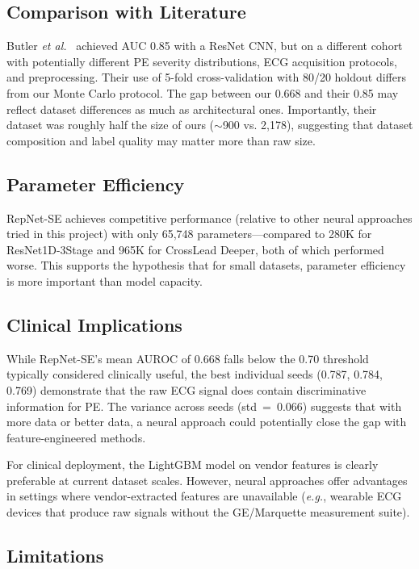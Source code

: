\documentclass[11pt,a4paper]{article}
\newcommand{\eg}{\textit{e.g.}}
\newcommand{\etal}{\textit{et al.}}
\begin{document}
\subsection{Comparison with Literature}

Butler \etal~\cite{butler2024} achieved AUC 0.85 with a ResNet CNN, but on a different cohort with potentially different PE severity distributions, ECG acquisition protocols, and preprocessing. Their use of 5-fold cross-validation with 80/20 holdout differs from our Monte Carlo protocol. The gap between our 0.668 and their 0.85 may reflect dataset differences as much as architectural ones. Importantly, their dataset was roughly half the size of ours ($\sim$900 vs. 2,178), suggesting that dataset composition and label quality may matter more than raw size.

\subsection{Parameter Efficiency}

RepNet-SE achieves competitive performance (relative to other neural approaches tried in this project) with only 65,748 parameters---compared to 280K for ResNet1D-3Stage and 965K for CrossLead Deeper, both of which performed worse. This supports the hypothesis that for small datasets, parameter efficiency is more important than model capacity.

\subsection{Clinical Implications}

While RepNet-SE's mean AUROC of 0.668 falls below the 0.70 threshold typically considered clinically useful, the best individual seeds (0.787, 0.784, 0.769) demonstrate that the raw ECG signal does contain discriminative information for PE. The variance across seeds (std~=~0.066) suggests that with more data or better data, a neural approach could potentially close the gap with feature-engineered methods.

For clinical deployment, the LightGBM model on vendor features is clearly preferable at current dataset scales. However, neural approaches offer advantages in settings where vendor-extracted features are unavailable (\eg, wearable ECG devices that produce raw signals without the GE/Marquette measurement suite).

\subsection{Limitations}
\end{document}
